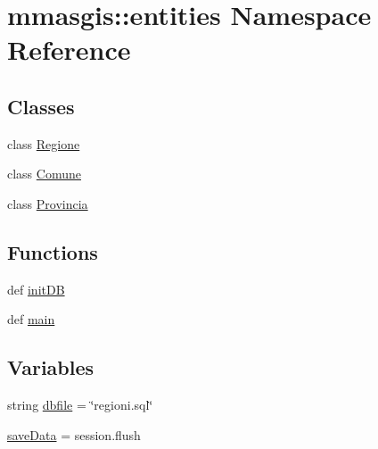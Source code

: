 \hypertarget{namespacemmasgis_1_1entities}{
\section{mmasgis::entities Namespace Reference}
\label{namespacemmasgis_1_1entities}
}
\subsection*{Classes}
\begin{DoxyCompactItemize}
\item 
class \hyperlink{classmmasgis_1_1entities_1_1Regione}{Regione}
\item 
class \hyperlink{classmmasgis_1_1entities_1_1Comune}{Comune}
\item 
class \hyperlink{classmmasgis_1_1entities_1_1Provincia}{Provincia}
\end{DoxyCompactItemize}
\subsection*{Functions}
\begin{DoxyCompactItemize}
\item 
def \hyperlink{namespacemmasgis_1_1entities_ae98db01ea35a5f158cb1307219ac8a7c}{initDB}
\item 
def \hyperlink{namespacemmasgis_1_1entities_a706c35573ccfa38ec3d0f01474d82241}{main}
\end{DoxyCompactItemize}
\subsection*{Variables}
\begin{DoxyCompactItemize}
\item 
string \hyperlink{namespacemmasgis_1_1entities_a41f58ecd0a573e521713277efe129cb3}{dbfile} = \char`\"{}regioni.sql\char`\"{}
\item 
\hyperlink{namespacemmasgis_1_1entities_a4585d41c6c31f5f98d064be58955105a}{saveData} = session.flush
\end{DoxyCompactItemize}


